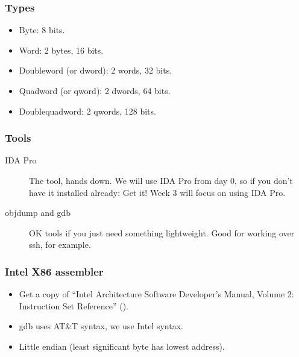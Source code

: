 \documentclass[slidestop,compress,mathserif, xcolor=table]{beamer}
\begin{document}
\begin{frame}
  \frametitle{Types}

  \begin{itemize}
  \item Byte: 8 bits.
  \item Word: 2 bytes, 16 bits.
  \item Doubleword (or dword): 2 words, 32 bits.
  \item Quadword (or qword): 2 dwords, 64 bits.
  \item Doublequadword: 2 qwords, 128 bits.
  \end{itemize}
\end{frame}

\begin{frame}
  \frametitle{Tools}

  \begin{description}
  \item[IDA Pro] The tool, hands down. We will use IDA Pro from day 0, so if you
    don't have it installed already: Get it! Week 3 will focus on using IDA Pro.
  \item[objdump and gdb] OK tools if you just need something lightweight. Good
    for working over ssh, for example.
  \end{description}
\end{frame}

\begin{frame}
  \frametitle{Intel X86 assembler}

  \begin{itemize}
  \item Get a copy of ``Intel Architecture Software Developer's Manual, Volume
    2: Instruction Set Reference'' (\cite{intel1999-vol2}).
  \item gdb uses AT\&T syntax, we use Intel syntax.
  \item Little endian (least significant byte has lowest address).
  \end{itemize}
\end{frame}
\end{document}
